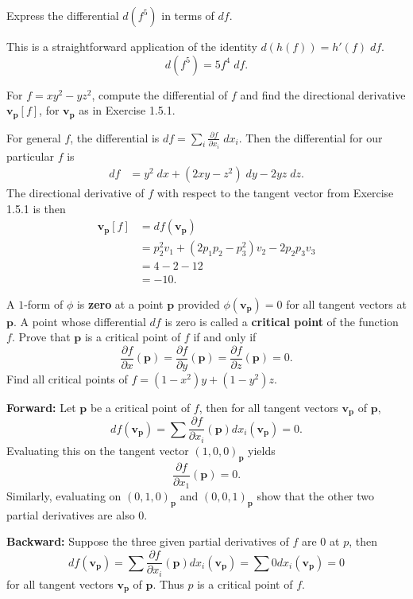 \documentclass[10pt]{report}
\begin{document}
\begin{exer}[1.5.4a]
	Express the differential $d(f^5)$ in terms of $df$.
\end{exer}
This is a straightforward application of the identity $d(h(f)) = h'(f) \;df.$
\[
	d(f^5) = 5f^4 \;df.
\] 

\begin{exer}[1.5.6a]
	For $f=xy^2-yz^2$, compute the differential of $f$ and find the directional derivative $\mathbf{v}_{\mathbf{p}}[f]$, for $\mathbf{v}_{\mathbf{p}}$ as in Exercise 1.5.1.
\end{exer}
For general $f$, the differential is $df = \sum_i \frac{\partial f}{\partial x_i} \;dx_i$. Then the differential for our particular $f$ is
\begin{align*}
	df &= y^2 \;dx + (2xy-z^2)\;dy -2yz\;dz.
\end{align*}
The directional derivative of $f$ with respect to the tangent vector from Exercise 1.5.1 is then
\begin{align*}
	\mathbf{v}_{\mathbf{p}}[f] &= df(\mathbf{v}_{\mathbf{p}}) \\
				   &= p_2^2v_1+(2p_1p_2-p_3^2)v_2-2p_2p_3v_3 \\
				   &= 4 - 2 - 12 \\
				   &= -10.
\end{align*}

\begin{exer}[1.5.9]
	A $1$-form of $\phi$ is \textbf{zero} at a point $\mathbf{p}$ provided $\phi(\mathbf{v}_{\mathbf{p}})=0$ for all tangent vectors at $\mathbf{p}$. A point whose differential $df$ is zero is called a \textbf{critical point} of the function $f$. Prove that $\mathbf{p}$ is a critical point of $f$ if and only if
	\[
		\frac{\partial f}{\partial x} (\mathbf{p})=\frac{\partial f}{\partial y} (\mathbf{p})=\frac{\partial f}{\partial z} (\mathbf{p})=0.
	\] 
	Find all critical points of $f=(1-x^2)y+(1-y^2)z$.
\end{exer}
\textbf{Forward:} Let $\mathbf{p}$ be a critical point of $f$, then for all tangent vectors $\mathbf{v}_{\mathbf{p}}$ of $\mathbf{p}$,
\[
	df(\mathbf{v}_{\mathbf{p}}) = \sum \frac{\partial f}{\partial x_i} (\mathbf{p})dx_i(\mathbf{v}_\mathbf{p}) = 0.
\] 
Evaluating this on the tangent vector $(1,0,0)_{\mathbf{p}}$ yields
\[
	\frac{\partial f}{\partial x_1} (\mathbf{p}) = 0.
\] Similarly, evaluating on $(0,1,0)_\mathbf{p}$ and $(0,0,1)_{\mathbf{p}}$ show that the other two partial derivatives are also 0.

\textbf{Backward:} Suppose the three given partial derivatives of $f$ are 0 at $p$, then
\[
	df(\mathbf{v}_\mathbf{p}) = \sum \frac{\partial f}{\partial x_i} (\mathbf{p})dx_i(\mathbf{v}_{\mathbf{p}}) = \sum 0 dx_i(\mathbf{v}_{\mathbf{p}}) = 0
\] for all tangent vectors $\mathbf{v}_{\mathbf{p}}$ of $\mathbf{p}$. Thus $p$ is a critical point of $f$.
\end{document}
